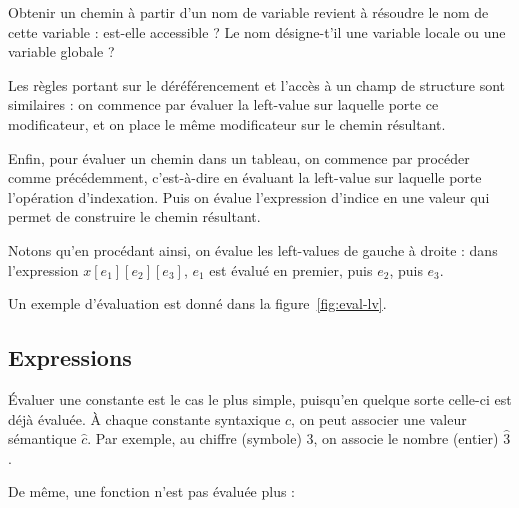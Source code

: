 Obtenir un chemin à partir d'un nom de variable revient à résoudre le nom de
cette variable : est-elle accessible ? Le nom désigne-t'il une variable locale
ou une variable globale ?

\begin{mathpar}
\end{mathpar}

Les règles portant sur le déréférencement et l'accès à un champ de structure
sont similaires : on commence par évaluer la left-value sur laquelle porte ce
modificateur, et on place le même modificateur sur le chemin résultant.

\begin{mathpar}

\end{mathpar}

Enfin, pour évaluer un chemin dans un tableau, on commence par procéder comme
précédemment, c'est-à-dire en évaluant la left-value sur laquelle porte
l'opération d'indexation. Puis on évalue l'expression d'indice en une valeur qui
permet de construire le chemin résultant.

\begin{mathpar}
\end{mathpar}

Notons qu'en procédant ainsi, on évalue les left-values de gauche à droite :
dans l'expression $x[e_1][e_2][e_3]$, $e_1$ est évalué en premier, puis
$e_2$, puis $e_3$.

Un exemple d'évaluation est donné dans la figure~\ref{fig:eval-lv}.

\subsection*{Expressions}

Évaluer une constante est le cas le plus simple, puisqu'en quelque sorte
celle-ci est déjà évaluée. À chaque constante syntaxique $c$, on peut associer
une valeur sémantique $\widehat{c}$. Par exemple, au chiffre (symbole) $3$, on
associe le nombre (entier) $\widehat{3}$.

\begin{mathpar}
\end{mathpar}

De même, une fonction n'est pas évaluée plus :

\begin{mathpar}
\end{mathpar}

